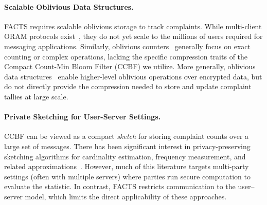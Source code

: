 \paragraph{Scalable Oblivious Data Structures.}
FACTS requires scalable oblivious storage to track complaints. While multi-client ORAM protocols exist~\cite{maffei-msmcoram,concuroram,MOSE}, they do not yet scale to the millions of users required for messaging applications. Similarly, oblivious counters~\cite{EC:KatMyeOst01, FC:GohGol05} generally focus on exact counting or complex operations, lacking the specific compression traits of the Compact Count-Min Bloom Filter (CCBF) we utilize. More generally, oblivious data structures~\cite{CCS:WNLCSS14, AC:KelSch14, SP:Shi20} enable higher-level oblivious operations over encrypted data, but do not directly provide the compression needed to store and update complaint tallies at large scale.

\paragraph{Private Sketching for User-Server Settings.}
CCBF can be viewed as a compact \emph{sketch} for storing complaint counts over a large set of messages. There has been significant interest in privacy-preserving sketching algorithms for cardinality estimation, frequency measurement, and related approximations~\cite{PoPETS:CDKY20, CCS:WJSYG19}. However, much of this literature targets multi-party settings (often with multiple servers) where parties run secure computation to evaluate the statistic. In contrast, FACTS restricts communication to the user--server model, which limits the direct applicability of these approaches.
